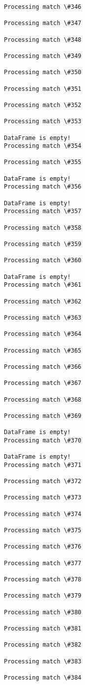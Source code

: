 \documentclass[11pt]{article}
\begin{document}
\begin{Verbatim}[commandchars=\\\{\}]
Processing match \#346

Processing match \#347

Processing match \#348

Processing match \#349

Processing match \#350

Processing match \#351

Processing match \#352

Processing match \#353

DataFrame is empty!
Processing match \#354

Processing match \#355

DataFrame is empty!
Processing match \#356

DataFrame is empty!
Processing match \#357

Processing match \#358

Processing match \#359

Processing match \#360

DataFrame is empty!
Processing match \#361

Processing match \#362

Processing match \#363

Processing match \#364

Processing match \#365

Processing match \#366

Processing match \#367

Processing match \#368

Processing match \#369

DataFrame is empty!
Processing match \#370

DataFrame is empty!
Processing match \#371

Processing match \#372

Processing match \#373

Processing match \#374

Processing match \#375

Processing match \#376

Processing match \#377

Processing match \#378

Processing match \#379

Processing match \#380

Processing match \#381

Processing match \#382

Processing match \#383

Processing match \#384


\end{Verbatim}
\end{document}
